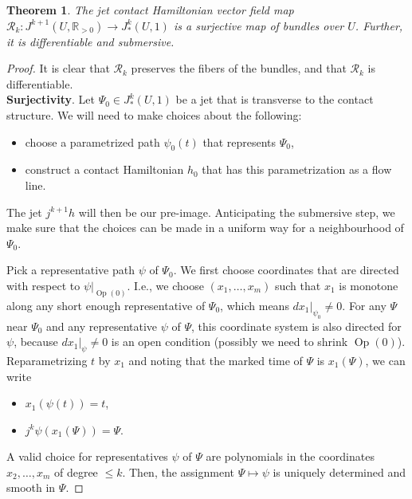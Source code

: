 \documentclass{amsart}
\newcommand{\Rcal}{{\mathcal{R}}}
\newcommand{\RR}{\mathbb{R}}
\newcommand{\Op}{\operatorname{Op}}
\newtheorem{theorem}{Theorem}
\theoremstyle{definition}
\theoremstyle{remark}
\numberwithin{equation}{section}
\newcommand{\bparagraph}[1]{\vspace{1em}\noindent\textbf{#1}.\hspace{0.2cm}}
\begin{document}
\begin{theorem}\label{thm:R_G}
    The jet contact Hamiltonian vector field map $\Rcal_k\colon J^{k+1}(U,\RR_{>0}) \longrightarrow J_*^k(U,1)$ is a surjective map of bundles over $U$. Further, it is differentiable and submersive.
\end{theorem}
\begin{proof}
    It is clear that $\Rcal_k$ preserves the fibers of the bundles, and that $\Rcal_k$ is differentiable.\\    
    \bparagraph{Surjectivity} Let $\Psi_0\in  J_*^k(U,1)$ be a jet that is transverse to the contact structure. We will need to make choices about the following:
    \begin{itemize}
        \item choose a parametrized path $\psi_0(t)$ that represents $\Psi_0$,
        \item construct a contact Hamiltonian $h_0$ that has this parametrization as a flow line.
    \end{itemize}
    The jet $j^{k+1}h$ will then be our pre-image. Anticipating the submersive step, we make sure that the choices can be made in a uniform way for a neighbourhood of $\Psi_0$.
    
    Pick a representative path $\psi$ of $\Psi_0$. We first choose coordinates that are directed with respect to $\psi|_{\Op(0)}$. I.e., we choose $(x_1,\ldots,x_m)$ such that $x_1$ is monotone along any short enough representative of $\Psi_0$, which means $dx_1|_{\psi_0}\neq 0$. For any $\Psi$ near $\Psi_0$ and any representative $\psi$ of $\Psi$, this coordinate system is also directed for $\psi$, because $dx_1|_{\psi}\neq 0$ is an open condition (possibly we need to shrink $\Op(0)$). Reparametrizing $t$ by $x_1$ and noting that the marked time of $\Psi$ is $x_1(\Psi)$, we can write 
    \begin{itemize}
        \item $x_1(\psi(t))=t$,
        \item $j^k\psi(x_1(\Psi))=\Psi$.
    \end{itemize}
    A valid choice for representatives $\psi$ of $\Psi$ are polynomials in the coordinates $x_2,\ldots,x_m$ of degree $\leq k$. Then, the assignment $\Psi\mapsto\psi$ is uniquely determined and smooth in $\Psi$. 
    

\end{proof}
\end{document}

